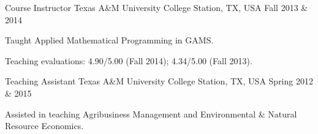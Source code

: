 \begin{cventries}
    \cventry
    {Course Instructor} %
    {Texas A\&M University} %
    {College Station, TX, USA} %
    {Fall 2013 \& 2014} %
    {
        \begin{cvitems} %
            \item {Taught Applied Mathematical Programming in GAMS.}
            \item {Teaching evaluations: 4.90/5.00 (Fall 2014); 4.34/5.00 (Fall 2013).}
        \end{cvitems}
    }

    \cventry
    {Teaching Assistant} %
    {Texas A\&M University} %
    {College Station, TX, USA} %
    {Spring 2012 \& 2015} %
    {
        \begin{cvitems} %
            \item {Assisted in teaching Agribusiness Management and Environmental \& Natural Resource Economics.}
        \end{cvitems}
    }

\end{cventries}
